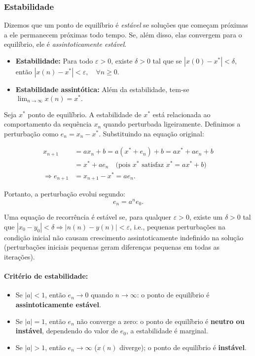 \documentclass{article}
\begin{document}
\subsubsection{Estabilidade}
Dizemos que um ponto de equilíbrio é \textit{estável} se soluções que
começam próximas a ele permanecem próximas  todo tempo. Se, além
disso, elas convergem para o equilíbrio, ele é \textit{assintoticamente
  estável}.
\begin{itemize}
\item \textbf{Estabilidade:} Para todo $\varepsilon > 0$, existe
  $\delta > 0$ tal que se $|x(0) - x^*| < \delta$, então
    \(
    |x(n) - x^*| < \varepsilon, \quad \forall n \geq 0.
    \)
    \item \textbf{Estabilidade assintótica:} Além da estabilidade, tem-se
    \(
    \lim_{n \to \infty} x(n) = x^*.
    \)
\end{itemize}
Seja $x^*$ ponto de equilíbrio. A estabilidade de $x^*$ está
relacionada ao comportamento da sequência $x_n$ quando perturbada
ligeiramente. Definimos a perturbação como $e_n = x_n -
x^*$. Substituindo na equação original:

\begin{align*}
x_{n+1} &= a x_n + b = a(x^* + e_n) + b = a x^* + a e_n + b \\
        &= x^* + a e_n \quad \text{(pois $x^*$ satisfaz $x^* = a x^* + b$)} \\
\Rightarrow e_{n+1} &= x_{n+1} - x^* = a e_n.
\end{align*}

Portanto, a perturbação evolui segundo:
\begin{equation}
e_n = a^n e_0.
\end{equation}

Uma equação de recorrência é estável se, para qualquer
$\varepsilon >0$, existe um $\delta >0$ tal que
$|x_0 -y_0|<\delta \Rightarrow |n(n) - y(n)| < \varepsilon$, i.e.,
pequenas perturbações na condição inicial não causam crescimento
assintoticamente indefinido na solução (perturbações iniciais pequenas
geram diferenças pequenas em todas as iterações).

\paragraph{Critério de estabilidade:}
\begin{itemize}
\item Se $|a| < 1$, então $e_n \to 0$ quando $n \to \infty$: o ponto de
  equilíbrio é \textbf{assintoticamente estável}.
\item Se $|a| = 1$, então $e_n$ não converge a zero: o ponto de
  equilíbrio é \textbf{neutro ou instável}, dependendo do valor de
  $e_0$, a estabilidade é marginal.
\item Se $|a| > 1$, então $e_n \to \infty$ ($x(n)$ diverge); o ponto de
  equilíbrio é \textbf{instável}.
\end{itemize}
\end{document}
